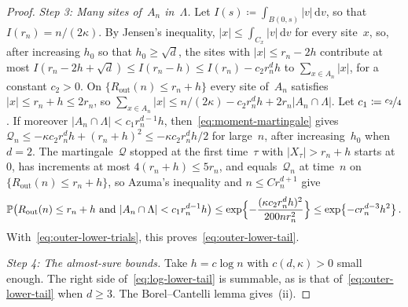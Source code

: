 \documentclass[11pt]{amsart}
\theoremstyle{plain}
\theoremstyle{definition}
\renewcommand{\P}{\mathbb P}
\newcommand{\drift}{\kappa}
\newcommand{\dd}{\,\mathrm d}
\newcommand{\nf}{\nicefrac}
\newcommand{\Rout}{R_{\mathrm{out}}}
\numberwithin{equation}{section}
\begin{document}
\begin{proof}
\emph{Step 3: Many sites of~$A_n$ in~$\Lambda$.} Let $I(s)\coloneqq\int_{B(0,s)}|v|\dd v$, so that $I(r_n)=n/(2\drift)$. By Jensen's inequality, $|x|\leq\int_{C_x}|v|\dd v$ for every site~$x$, so, after increasing $h_0$ so that $h_0\geq\sqrt d$, the sites with $|x|\leq r_n-2h$ contribute at most $I(r_n-2h+\sqrt d)\leq I(r_n-h)\leq I(r_n)-c_2r_n^dh$ to $\sum_{x\in A_n}|x|$, for a constant $c_2>0$. On $\{\Rout(n)\leq r_n+h\}$ every site of~$A_n$ satisfies $|x|\leq r_n+h\leq2r_n$, so $\sum_{x\in A_n}|x|\leq n/(2\drift)-c_2r_n^dh+2r_n|A_n\cap\Lambda|$. Let $c_1\coloneqq\nf{c_2}{4}$. If moreover $|A_n\cap\Lambda|<c_1r_n^{d-1}h$, then~\eqref{eq:moment-martingale} gives $\mathcal Q_n\leq-\drift c_2r_n^dh+(r_n+h)^2\leq-\drift c_2r_n^dh/2$ for large~$n$, after increasing~$h_0$ when $d=2$. The martingale~$\mathcal Q$ stopped at the first time~$\tau$ with $|X_\tau|>r_n+h$ starts at~$0$, has increments at most $4(r_n+h)\leq5r_n$, and equals~$\mathcal Q_n$ at time~$n$ on $\{\Rout(n)\leq r_n+h\}$, so Azuma's inequality and $n\leq Cr_n^{d+1}$ give
\begin{equation*}
\P\bigl(\Rout(n)\leq r_n+h\text{ and }|A_n\cap\Lambda|<c_1r_n^{d-1}h\bigr)
\leq\exp\Bigl\{-\frac{(\drift c_2r_n^dh)^2}{200nr_n^2}\Bigr\}\leq\exp\bigl\{-cr_n^{d-3}h^2\bigr\}\, .
\end{equation*}
With~\eqref{eq:outer-lower-trials}, this proves~\eqref{eq:outer-lower-tail}.

\emph{Step 4: The almost-sure bounds.} Take $h=c\log n$ with $c(d,\drift)>0$ small enough. The right side of~\eqref{eq:log-lower-tail} is summable, as is that of~\eqref{eq:outer-lower-tail} when $d\geq3$. The Borel--Cantelli lemma gives~(ii).
\end{proof}



\end{document}
